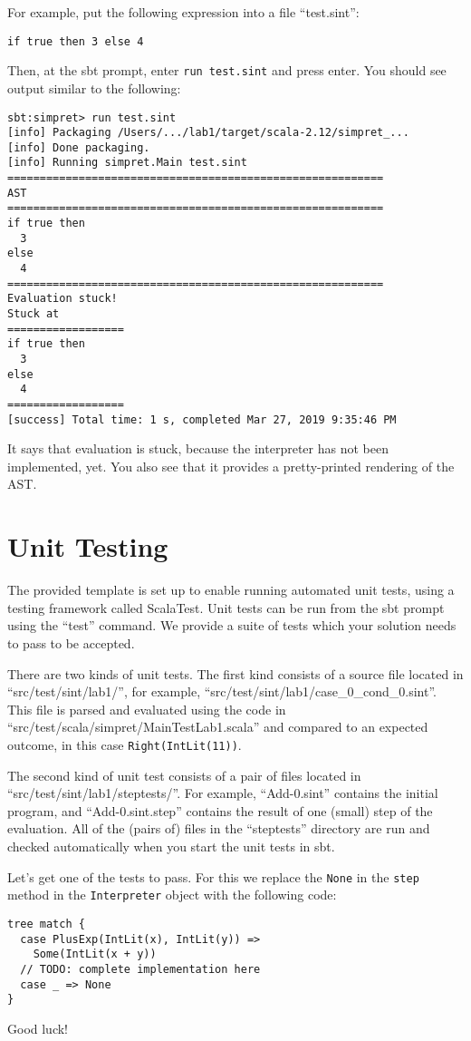 \documentclass[12pt, a4paper, twoside]{article}
\begin{document}
For example, put the following expression into a file ``test.sint'':
\begin{verbatim}
if true then 3 else 4
\end{verbatim}

Then, at the sbt prompt, enter \texttt{run test.sint} and press
enter. You should see output similar to the following:

\begin{verbatim}
sbt:simpret> run test.sint
[info] Packaging /Users/.../lab1/target/scala-2.12/simpret_...
[info] Done packaging.
[info] Running simpret.Main test.sint
==========================================================
AST
==========================================================
if true then
  3
else
  4
==========================================================
Evaluation stuck!
Stuck at
==================
if true then
  3
else
  4
==================
[success] Total time: 1 s, completed Mar 27, 2019 9:35:46 PM
\end{verbatim}

It says that evaluation is stuck, because the interpreter has not been
implemented, yet. You also see that it provides a pretty-printed
rendering of the AST.

\section{Unit Testing}

The provided template is set up to enable running automated unit
tests, using a testing framework called ScalaTest. Unit tests can be
run from the sbt prompt using the ``test'' command. We provide a suite
of tests which your solution needs to pass to be accepted.

There are two kinds of unit tests. The first kind consists of a source
file located in ``src/test/sint/lab1/'', for example,
\newline``src/test/sint/lab1/case\_0\_cond\_0.sint''. This file is parsed and
evaluated using the code in
\newline``src/test/scala/simpret/MainTestLab1.scala'' and compared to an
expected outcome, in this case \verb|Right(IntLit(11))|.

The second kind of unit test consists of a pair of files located in
\newline``src/test/sint/lab1/steptests/''. For example, ``Add-0.sint''
contains the initial program, and ``Add-0.sint.step'' contains the result
of one (small) step of the evaluation. All of the (pairs of) files in
the ``steptests'' directory are run and checked automatically when you
start the unit tests in sbt.

Let's get one of the tests to pass. For this we replace the
\verb|None| in the \verb|step| method in the \verb|Interpreter| object
with the following code:

\begin{verbatim}
tree match {
  case PlusExp(IntLit(x), IntLit(y)) =>
    Some(IntLit(x + y))
  // TODO: complete implementation here
  case _ => None
}
\end{verbatim}

Good luck!
\end{document}
